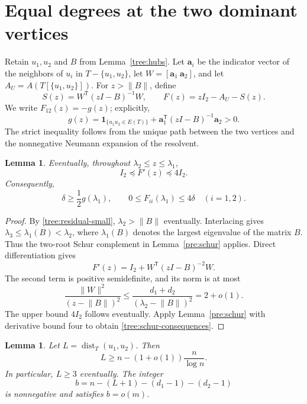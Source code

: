 \documentclass[11pt,a4paper]{article}
\numberwithin{equation}{section}
\newtheorem{lemma}[theorem]{Lemma}
\theoremstyle{definition}
\theoremstyle{remark}
\begin{document}
\section{Equal degrees at the two dominant vertices}
\label{tree:degree-section}

Retain $u_1,u_2$ and $B$ from Lemma~\ref{tree:hubs}. Let
$\mathbf a_i$ be the indicator vector of the neighbors of $u_i$
in $T-\{u_1,u_2\}$, let $W=[\mathbf a_1\ \mathbf a_2]$, and let
$A_U=A(T[\{u_1,u_2\}])$. For $z>\lVert B\rVert$, define
\begin{equation}\label{tree:schur-definition}
 S(z)=W^{\mathsf T}(zI-B)^{-1}W,
 \qquad F(z)=zI_2-A_U-S(z).
\end{equation}
We write $F_{12}(z)=-g(z)$; explicitly,
\[
 g(z)=\mathbf1_{\{u_1u_2\in E(T)\}}
      +\mathbf a_1^{\mathsf T}(zI-B)^{-1}\mathbf a_2>0.
\]
The strict inequality follows from the unique path between the two
vertices and the nonnegative Neumann expansion of the resolvent.

\begin{lemma}\label{tree:schur-bounds}
Eventually, throughout $\lambda_2\leq z\leq\lambda_1$,
\[
 I_2\preceq F'(z)\preceq4I_2.
\]
Consequently,
\begin{equation}\label{tree:schur-consequences}
 \delta\geq\frac12g(\lambda_1),\qquad
 0\leq F_{ii}(\lambda_1)\leq4\delta\quad(i=1,2).
\end{equation}
\end{lemma}

\begin{proof}
By \eqref{tree:residual-small}, $\lambda_2>\lVert B\rVert$
eventually. Interlacing gives $\lambda_3\leq\lambda_1(B)<\lambda_2$,
where $\lambda_1(B)$ denotes the largest eigenvalue of the matrix
$B$. Thus the two-root Schur complement in Lemma~\ref{pre:schur}
applies. Direct differentiation gives
\[
 F'(z)=I_2+W^{\mathsf T}(zI-B)^{-2}W.
\]
The second term is positive semidefinite, and its norm is at most
\[
 \frac{\lVert W\rVert^2}{(z-\lVert B\rVert)^2}
 \leq\frac{d_1+d_2}{(\lambda_2-\lVert B\rVert)^2}
 =2+o(1).
\]
The upper bound $4I_2$ follows eventually. Apply
Lemma~\ref{pre:schur} with derivative bound four to obtain
\eqref{tree:schur-consequences}.
\end{proof}

\begin{lemma}\label{tree:budget}
Let $L=\operatorname{dist}_T(u_1,u_2)$. Then
\begin{equation}\label{tree:separation}
 L\geq n-(1+o(1))\frac{n}{\log n}.
\end{equation}
In particular, $L\geq3$ eventually. The integer
\begin{equation}\label{tree:b-definition}
 b=n-(L+1)-(d_1-1)-(d_2-1)
\end{equation}
is nonnegative and satisfies $b=o(m)$.
\end{lemma}
\end{document}
